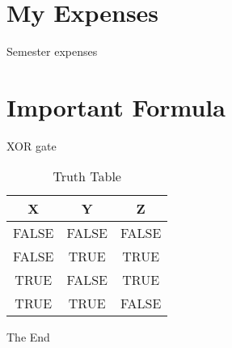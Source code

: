 \documentclass[]{beamer}
\begin{document}
\section{My Expenses}
\begin{frame}{Semester expenses}
\end{frame}


\section{Important Formula}
\begin{frame}{XOR gate}

\begin{table}[]
    \centering
        \begin{tabular}{ c c c }
         \toprule
         \textbf{X} & \textbf{Y} & \textbf{Z} \\
         \hline
         FALSE & FALSE & FALSE \\ 
         FALSE & TRUE & TRUE \\ 
         TRUE & FALSE & TRUE \\
         TRUE & TRUE & FALSE \\
         \bottomrule
\end{tabular}
    \caption{Truth Table}
    \label{tab:label}
\end{table}
\end{frame}
\begin{frame}

\begin{center}
\Huge{The End}
\end{center}

\end{frame}
\end{document}
